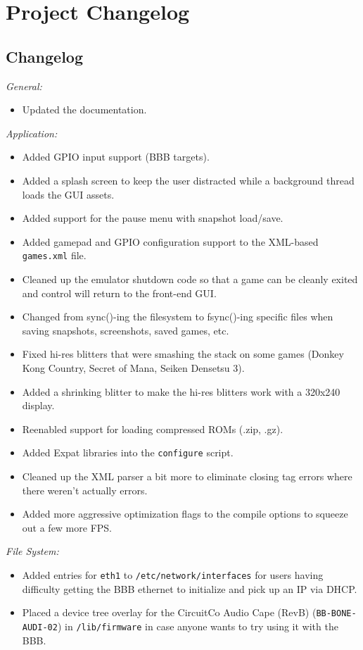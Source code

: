 \chapter{Project Changelog}

\section{Changelog}


\noindent{}\emph{General:}
\begin{itemize}
\item Updated the documentation.
\end{itemize}

\noindent{}\emph{Application:}
\begin{itemize}
\item Added GPIO input support (BBB targets).
\item Added a splash screen to keep the user distracted while a background thread loads the GUI assets.
\item Added support for the pause menu with snapshot load/save.
\item Added gamepad and GPIO configuration support to the XML-based \texttt{games.xml} file.
\item Cleaned up the emulator shutdown code so that a game can be cleanly exited and control will return to the front-end GUI.
\item Changed from sync()-ing the filesystem to fsync()-ing specific files when saving snapshots, screenshots, saved games, etc.
\item Fixed hi-res blitters that were smashing the stack on some games (Donkey Kong Country, Secret of Mana, Seiken Densetsu 3).
\item Added a shrinking blitter to make the hi-res blitters work with a 320x240 display.
\item Reenabled support for loading compressed ROMs (.zip, .gz).
\item Added Expat libraries into the \texttt{configure} script.
\item Cleaned up the XML parser a bit more to eliminate closing tag errors where there weren't actually errors.
\item Added more aggressive optimization flags to the compile options to squeeze out a few more FPS. 
\end{itemize}

\noindent{}\emph{File System:}
\begin{itemize}
\item Added entries for \texttt{eth1} to \texttt{/etc/network/interfaces} for users having difficulty getting the BBB ethernet to initialize and pick up an IP via DHCP.
\item Placed a device tree overlay for the CircuitCo Audio Cape (RevB) (\texttt{BB-BONE-AUDI-02}) in \texttt{/lib/firmware} in case anyone wants to try using it with the BBB. 
\end{itemize}

